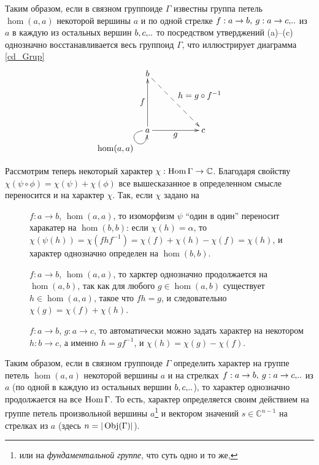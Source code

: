     Таким образом, если в связном группоиде $\Gamma$ известны группа петель 
    $\hom(a,a)$ некоторой вершины $a$ и по одной стрелке $f: a \to b,\: 
    g: a \to c,\!..$ из $a$ в каждую из остальных вершин $b,c,\!..$ то 
    посредством утверджений (a)--(c) однозначно восстанавливается весь группоид 
    $\Gamma$, что иллюстрирует диаграмма \eqref{cd_Grup}
    \begin{equation}\label{cd_Grup}
    \xymatrix{
        b \ar@{-->}[ddrr]^{\textstyle{h=g \circ f^{-1}}}  &  & \\
        & & \\
        a \ar@(l,d)[]_{\textstyle{\hom(a,a)}} \ar[uu]^{\textstyle{f}} \ar[rr]_{\textstyle{g}} & & c
    }
    \end{equation}

    Рассмотрим теперь некоторый характер $\chi: \operatorname*{Hom} \Gamma \to \mathbb{C}$.
    Благодаря свойству $\chi(\psi \circ \phi) = \chi(\psi) + \chi(\phi)$ все 
    вышесказанное в определенном смысле переносится и на характер $\chi$. Так, 
    если $\chi$ задано на 
    \begin{description}
        \item[] $f: a \to b$, $\hom(a,a)$, то изоморфизм $\psi$ 
        ``один в один'' переносит харакатер на $\hom (b,b)$: если 
        $\chi(h) = \alpha$, то $\chi(\psi(h)) = \chi(fhf^{-1}) = \chi(f) + 
        \chi(h) - \chi(f) = \chi(h)$, и характер однозначно определен на 
        $\hom(b,b)$.
        \item[] $f: a \to b$, $\hom(a,a)$, то харктер однозначно 
        продолжается на $\hom(a,b)$, так как для любого $g \in \hom(a,b)$ существует 
        $h \in \hom(a,a)$, такое что $fh = g$, и следовательно $\chi(g) = 
        \chi(f) + \chi(h)$.
        \item[] $f: a \to b$, $g: a \to c$, то автоматически 
        можно задать характер на некотором $h: b \to c$, а именно $h = gf^{-1}$, 
        и $\chi(h) = \chi(g) - \chi(f)$.
    \end{description}

    Таким образом, если в связном группоиде $\Gamma$ определить характер на 
    группе петель $\hom(a,a)$ некоторой вершины $a$ и на стрелках $f: a \to b,\: 
    g: a \to c,\!..$ из $a$ (по одной в каждую из остальных вершин $b,c,\!..$), то 
    характер однозначно продолжается на все $\operatorname*{Hom} \Gamma$. То есть, характер 
    определяется своим  действием на группе петель произвольной
    вершины $a$\footnote{или на \emph{фундаментальной группе}, что суть 
    одно и то же,} и вектором значений $s \in \mathbb{C}^{n-1}$ на стрелках из 
    $a$ (здесь $n = |\operatorname*{Obj}(\Gamma)|$).


